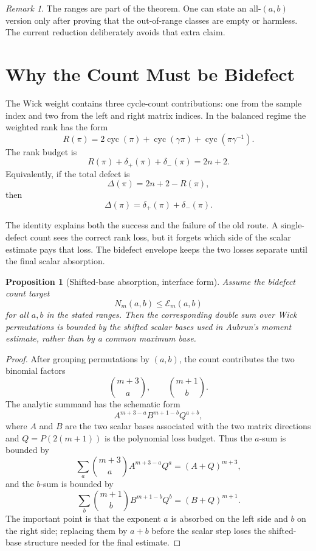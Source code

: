 \documentclass[11pt]{article}
\theoremstyle{plain}
\newtheorem{proposition}[theorem]{Proposition}
\theoremstyle{definition}
\theoremstyle{remark}
\newtheorem{remark}[theorem]{Remark}
\DeclareMathOperator{\cyc}{cyc}
\newcommand{\g}{\gamma}
\newcommand{\p}{\pi}
\newcommand{\defp}{\delta_{+}}
\newcommand{\defm}{\delta_{-}}
\newcommand{\Def}{\Delta}
\newcommand{\Env}{\mathcal E}
\begin{document}
\begin{remark}
The ranges are part of the theorem.  One can state an all-\((a,b)\) version
only after proving that the out-of-range classes are empty or harmless.  The
current reduction deliberately avoids that extra claim.
\end{remark}

\section{Why the Count Must be Bidefect}

The Wick weight contains three cycle-count contributions: one from the sample
index and two from the left and right matrix indices.  In the balanced regime
the weighted rank has the form
\[
  R(\p)=2\cyc(\p)+\cyc(\g\p)+\cyc(\p\g^{-1}).
\]
The rank budget is
\[
  R(\p)+\defp(\p)+\defm(\p)=2n+2.
\]
Equivalently, if the total defect is
\[
  \Def(\p)=2n+2-R(\p),
\]
then
\[
  \Def(\p)=\defp(\p)+\defm(\p).
\]

The identity explains both the success and the failure of the old route.  A
single-defect count sees the correct rank loss, but it forgets which side of
the scalar estimate pays that loss.  The bidefect envelope keeps the two
losses separate until the final scalar absorption.

\begin{proposition}[Shifted-base absorption, interface form]
Assume the bidefect count target
\[
  N_m(a,b)\leq \Env_m(a,b)
\]
for all \(a,b\) in the stated ranges.  Then the corresponding double sum over
Wick permutations is bounded by the shifted scalar bases used in Aubrun's
moment estimate, rather than by a common maximum base.
\end{proposition}

\begin{proof}
After grouping permutations by \((a,b)\), the count contributes the two
binomial factors
\[
  \binom{m+3}{a},\qquad \binom{m+1}{b}.
\]
The analytic summand has the schematic form
\[
  A^{m+3-a} B^{m+1-b} Q^{a+b},
\]
where \(A\) and \(B\) are the two scalar bases associated with the two matrix
directions and \(Q=P(2(m+1))\) is the polynomial loss budget.  Thus the
\(a\)-sum is bounded by
\[
  \sum_a \binom{m+3}{a} A^{m+3-a}Q^a=(A+Q)^{m+3},
\]
and the \(b\)-sum is bounded by
\[
  \sum_b \binom{m+1}{b} B^{m+1-b}Q^b=(B+Q)^{m+1}.
\]
The important point is that the exponent \(a\) is absorbed on the left side
and \(b\) on the right side; replacing them by \(a+b\) before the scalar step
loses the shifted-base structure needed for the final estimate.
\end{proof}
\end{document}

